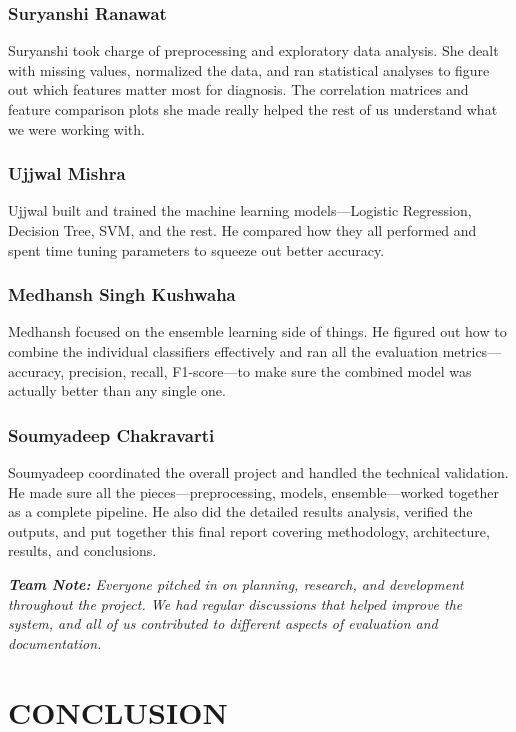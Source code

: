 \documentclass[12pt]{article}
\begin{document}
\subsubsection*{Suryanshi Ranawat}
Suryanshi took charge of preprocessing and exploratory data analysis. She dealt with missing values, normalized the data, and ran statistical analyses to figure out which features matter most for diagnosis. The correlation matrices and feature comparison plots she made really helped the rest of us understand what we were working with.

\subsubsection*{Ujjwal Mishra}
Ujjwal built and trained the machine learning models---Logistic Regression, Decision Tree, SVM, and the rest. He compared how they all performed and spent time tuning parameters to squeeze out better accuracy.

\subsubsection*{Medhansh Singh Kushwaha}
Medhansh focused on the ensemble learning side of things. He figured out how to combine the individual classifiers effectively and ran all the evaluation metrics---accuracy, precision, recall, F1-score---to make sure the combined model was actually better than any single one.

\subsubsection*{Soumyadeep Chakravarti}
Soumyadeep coordinated the overall project and handled the technical validation. He made sure all the pieces---preprocessing, models, ensemble---worked together as a complete pipeline. He also did the detailed results analysis, verified the outputs, and put together this final report covering methodology, architecture, results, and conclusions.

\vspace{0.5cm}
\noindent\textit{\textbf{Team Note:} Everyone pitched in on planning, research, and development throughout the project. We had regular discussions that helped improve the system, and all of us contributed to different aspects of evaluation and documentation.}

\newpage
\section{CONCLUSION}
\end{document}
